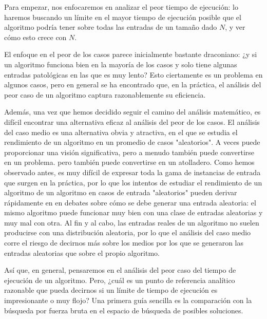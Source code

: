 \documentclass[a4paper, 12pt]{book}
\theoremstyle{dotless}
\begin{document}
Para empezar, nos enfocaremos en analizar el peor tiempo de ejecución: lo haremos buscando un límite en el mayor tiempo de ejecución posible que el algoritmo podría tener sobre todas las entradas de un tamaño dado $N$, y ver cómo esto crece con $N$. 

El enfoque en el peor de los casos parece inicialmente bastante draconiano: ¿y si un algoritmo funciona bien en la mayoría de los casos y solo tiene algunas entradas patológicas en las que es muy lento? Esto ciertamente es un problema en algunos casos, pero en general se ha encontrado que, en la práctica, el análisis del peor caso de un algoritmo captura razonablemente su eficiencia.

Además, una vez que hemos decidido seguir el camino del análisis matemático, es difícil encontrar una alternativa eficaz al análisis del peor de los casos. El análisis del caso medio es una alternativa obvia y atractiva, en el que se estudia el rendimiento de un algoritmo en un promedio de casos "aleatorios". A veces puede proporcionar una visión significativa, pero a menudo también puede convertirse en un problema.
pero también puede convertirse en un atolladero. Como hemos observado antes, es muy difícil de expresar toda la gama de instancias de entrada que surgen en la práctica, por lo que los intentos de estudiar el rendimiento de un algoritmo de un algoritmo en casos de entrada "aleatorios" pueden derivar rápidamente en en debates sobre cómo se debe generar una entrada aleatoria: el mismo algoritmo puede funcionar muy bien con una clase de entradas aleatorias y muy mal con otra. Al fin y al cabo, las entradas reales de un algoritmo no suelen producirse con una distribución aleatoria, por lo que el análisis del caso medio corre el riesgo de decirnos más sobre los medios por los que se generaron las entradas aleatorias que sobre el propio algoritmo.

Así que, en general, pensaremos en el análisis del peor caso del tiempo de ejecución de un algoritmo. Pero, ¿cuál es un punto de referencia analítico razonable que pueda decirnos si un límite de tiempo de ejecución es impresionante o muy flojo? Una primera guía sencilla
es la comparación con la búsqueda por fuerza bruta en el espacio de búsqueda de posibles soluciones.
\end{document}
